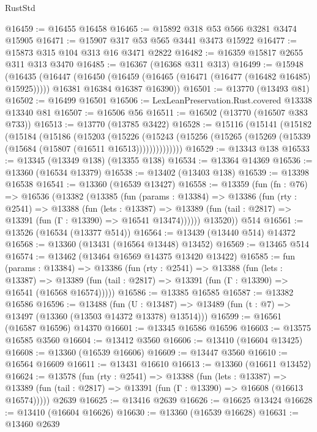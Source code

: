 \begin{lexlean}{RustStd}
\begin{coremodule}
@16459 := @16455 @16458
@16465 := @15892 @318 @53 @566 @3281 @3474 @15905
@16471 := @15907 @317 @53 @565 @3441 @3473 @15922
@16477 := @15873 @315 @104 @313 @16 @3471 @2822
@16482 := @16359 @15817 @2655 @311 @313 @3470
@16485 := @16367 (@16368 @311 @313)
@16499 := @15948
    (@16435
      (@16447
        (@16450 (@16459 (@16465 (@16471 (@16477 (@16482 @16485) @15925)))))
        @16381
        @16384
        @16387
        @16390))
@16501 := @13770 (@13493 @81)
@16502 := @16499 @16501
@16506 := LexLeanPreservation.Rust.covered @13338 @13340 @81
@16507 := @16506 @56
@16511 := @16502 (@13770 (@16507 @383 @733))
@16513 := @13770 (@13785 @3422)
@16528 := @15116
    (@15141
      (@15182
        (@15184
          (@15186
            (@15203
              (@15226
                (@15243 (@15256 (@15265 (@15269 (@15339 (@15684 (@15807 (@16511 @16513))))))))))))))
@16529 := @13343 @138
@16533 := @13345 (@13349 @138) (@13355 @138)
@16534 := @13364 @14369
@16536 := @13360 (@16534 @13379)
@16538 := @13402 (@13403 @138)
@16539 := @13398 @16538
@16541 := @13360 (@16539 @13427)
@16558 := @13359
    (fun (fn : @76) =>
    @16536
      (@13382
        (@13385
          (fun (params : @13384) =>
          @13386
            (fun (rty : @2541) =>
            @13388
              (fun (lets : @13387) =>
              @13389 (fun (tail : @2817) => @13391 (fun (Γ : @13390) => @16541 @13474))))))
        @13520))
    @514
@16561 := @13526 (@16534 (@13377 @514))
@16564 := @13439 (@13440 @514) @14372
@16568 := @13360 (@13431 (@16564 @13448) @13452)
@16569 := @13465 @514
@16574 := @13462 (@13464 @16569 @14375 @13420 @13422)
@16585 := fun (params : @13384) =>
  @13386
    (fun (rty : @2541) =>
    @13388
      (fun (lets : @13387) =>
      @13389 (fun (tail : @2817) => @13391 (fun (Γ : @13390) => @16541 (@16568 @16574)))))
@16586 := @13385 @16585
@16587 := @13382 @16586
@16596 := @13488
    (fun (U : @13487) => @13489 (fun (t : @7) => @13497 (@13360 (@13503 @14372 @13378) @13514)))
@16599 := @16561 (@16587 @16596) @14370
@16601 := @13345 @16586 @16596
@16603 := @13575 @16585 @3560
@16604 := @13412 @3560
@16606 := @13410 (@16604 @13425)
@16608 := @13360 (@16539 @16606)
@16609 := @13447 @3560
@16610 := @16564 @16609
@16611 := @13431 @16610
@16613 := @13360 (@16611 @13452)
@16624 := @13578
    (fun (rty : @2541) =>
    @13388
      (fun (lets : @13387) =>
      @13389 (fun (tail : @2817) => @13391 (fun (Γ : @13390) => @16608 (@16613 @16574)))))
    @2639
@16625 := @13416 @2639
@16626 := @16625 @13424
@16628 := @13410 (@16604 @16626)
@16630 := @13360 (@16539 @16628)
@16631 := @13460 @2639

\end{coremodule}
\end{lexlean}
